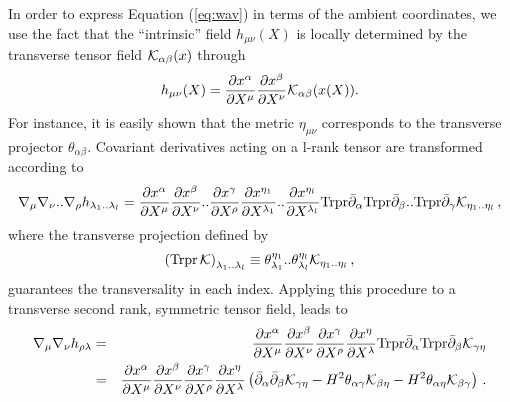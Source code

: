 \documentclass[a4paper,11pt,showpacs,preprintnumbers]{revtex4}
\begin{document}
In order to express Equation (\ref{eq:wav}) in terms of the
ambient coordinates, we use the fact that the ``intrinsic'' field
$h_{\mu\nu}(X)$ is locally determined by the transverse tensor
field ${\cal K}_{\alpha\beta}(x)$ through
\begin{equation}
h_{\mu\nu}(X)=\frac{\partial x^\alpha}{\partial X^\mu}
\frac{\partial x^\beta} {\partial X^\nu}{\cal
K}_{\alpha\beta}(x(X)).
\end{equation}
For instance, it is easily shown that the metric $\eta_{\mu\nu}$
corresponds  to the transverse projector $\theta_{\alpha\beta}$.
Covariant derivatives acting on a l-rank tensor are transformed
according to
\begin{equation}
\nabla_{\mu}\nabla_{\nu}..\nabla_{\rho}h_{\lambda_{1}..\lambda_{l}}=
\frac{\partial x^\alpha}{\partial X^\mu} \frac{\partial x^\beta}
{\partial X^\nu}..\frac{\partial x^\gamma}{\partial X^\rho}
\frac{\partial x^{\eta_{1}}}{\partial X^{\lambda_{1}}}
..\frac{\partial x^{\eta_{l}}} {\partial X^{\lambda_{l}}}
\mbox{Trpr}\bar{\partial}_{\alpha}\mbox{Trpr}\bar{\partial}_{\beta}
..\mbox{Trpr}\bar{\partial}_{\gamma}{\cal
K}_{\eta_{1}..\eta_{l}}\,,
\end{equation}
where the transverse projection defined by
\begin{equation} \left(\mbox{Trpr}
\,{\cal
K}\right)_{\lambda_{1}..\lambda_{l}}\equiv\theta^{\eta_{1}}_{\lambda_{1}}
..\theta^{\eta_{l}}_{\lambda_{l}}{\cal
K}_{\eta_{1}..\eta_{l}}\,,\nonumber
\end{equation}
guarantees  the transversality  in each index. Applying this
procedure to a transverse second rank, symmetric tensor field,
leads to
\begin{eqnarray}\label{eqn:cova}
\nabla_{\mu}\nabla_{\nu}h_{\rho\lambda}&=& \frac{\partial
x^\alpha}{\partial X^\mu} \frac{\partial x^\beta} {\partial
X^\nu}\frac{\partial x^\gamma}{\partial X^\rho} \frac{\partial
x^{\eta}}{\partial X^{\lambda}}
\mbox{Trpr}\bar{\partial}_{\alpha}\mbox{Trpr}
\bar{\partial}_{\beta}{\cal K}_{\gamma\eta} \nonumber\\
&=&\frac{\partial x^\alpha}{\partial X^\mu} \frac{\partial
x^\beta} {\partial X^\nu}\frac{\partial x^\gamma}{\partial X^\rho}
\frac{\partial x^{\eta}}{\partial X^{\lambda}}
\left(\bar{\partial}_{\alpha}\bar{\partial}_{\beta}{\cal
K}_{\gamma\eta}-H^{2} \theta_{\alpha\gamma}{\cal
K}_{\beta\eta}-H^{2}\theta_{\alpha\eta}{\cal K}_{\beta\gamma}
\right)\,.
\end{eqnarray}
\end{document}
